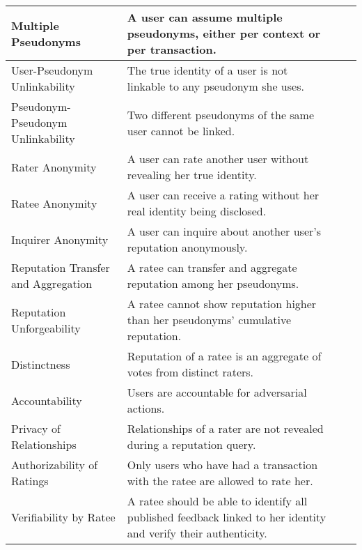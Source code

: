 \begin{longtable}{|p{3cm}|p{4.5cm}|p{5cm}|p{1.5cm}|}
Multiple Pseudonyms & A user can assume multiple pseudonyms, either per context or per transaction. & & \\
\hline
User-Pseudonym Unlinkability & The true identity of a user is not linkable to any pseudonym she uses. & & \\
\hline
Pseudonym-Pseudonym Unlinkability & Two different pseudonyms of the same user cannot be linked. & & \\
\hline
Rater Anonymity & A user can rate another user without revealing her true identity. & & \\
\hline
Ratee Anonymity & A user can receive a rating without her real identity being disclosed. & & \\
\hline
Inquirer Anonymity & A user can inquire about another user's reputation anonymously. & & \\
\hline
Reputation Transfer and Aggregation & A ratee can transfer and aggregate reputation among her pseudonyms. & & \\
\hline
Reputation Unforgeability & A ratee cannot show reputation higher than her pseudonyms' cumulative reputation. & & \\
\hline
Distinctness & Reputation of a ratee is an aggregate of votes from distinct raters. & & \\
\hline
Accountability & Users are accountable for adversarial actions. & & \\
\hline
Privacy of Relationships & Relationships of a rater are not revealed during a reputation query. & & \\
\hline
Authorizability of Ratings & Only users who have had a transaction with the ratee are allowed to rate her. & & \\
\hline
Verifiability by Ratee & A ratee should be able to identify all published feedback linked to her identity and verify their authenticity. & & \\
\hline
\end{longtable}
